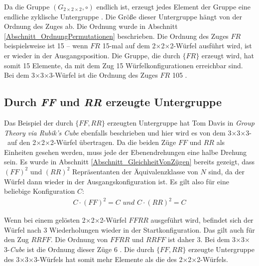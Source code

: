 \documentclass[12pt,a4paper, usenames, dvipsnames]{article}
\theoremstyle{mystyle}
\theoremstyle{definition}
\newcommand{\Gtwo}{\ensuremath{G_{2\times 2\times 2}}}
\newcommand{\Ttwo}{2$\times$2$\times$2-}
\newcommand{\Tthree}{3$\times$3$\times$3-}
\begin{document}
Da die Gruppe $(\Gtwo, \circ)$ endlich ist, erzeugt jedes Element der Gruppe eine endliche zyklische Untergruppe \cite{TD}. Die Größe dieser Untergruppe hängt von der Ordnung des Zuges ab. Die Ordnung wurde in Abschnitt \ref{Abschnitt_OrdnungPermutationen} beschrieben.
Die Ordnung des Zuges $FR$ beispielsweise ist 15 -- wenn $FR$ 15-mal auf dem \Ttwo Würfel ausführt wird, ist er wieder in der Ausgangsposition. 
Die Gruppe, die durch $\{FR\}$ erzeugt wird, hat somit 15 Elemente, da mit dem Zug 15 Würfelkonfigurationen erreichbar sind. Bei dem \Tthree Würfel ist die Ordnung des Zuges $FR$ 105 \cite{TD}.
%
%
%
%
%
%
%
%
%
%
%
%
%
%
%
%
%
%
%

\subsection{Durch \textit{FF} und \textit{RR} erzeugte Untergruppe}
\label{Abschnitt_UntergruppeFFRR}

Das Beispiel der durch $\{ FF, RR \}$ erzeugten Untergruppe hat Tom Davis in \textit{Group Theory via Rubik's Cube} \cite{TD} ebenfalls beschrieben und hier wird es von dem \Tthree \ auf den \Ttwo Würfel übertragen.
Da die beiden Züge $FF$ und $RR$ als Einheiten gesehen werden, muss jede der Ebenendrehungen eine halbe Drehung sein.
Es wurde in Abschnitt \ref{Abschnitt_GleichheitVonZügen} bereits gezeigt, dass $(FF)^2$ und $(RR)^2$ Repräsentanten der Äquivalenzklasse von $N$ sind, da der Würfel dann wieder in der Ausgangskonfiguration ist. Es gilt also für eine beliebige Konfiguration $C$:
\begin{align*}
C \cdot (FF)^2 = C \textit{ und } C \cdot (RR)^2 = C
\end{align*}

Wenn bei einem gelösten \Ttwo Würfel $FFRR$ ausgeführt wird, befindet sich der Würfel nach 3 Wiederholungen wieder in der Startkonfiguration. Das gilt auch für den Zug $RRFF$. Die Ordnung von $FFRR$ und $RRFF$ ist daher 3. Bei dem \Tthree \textit{Cube} ist die Ordnung dieser Züge 6 \cite{TD}.
Die durch $\{ FF, RR \}$ erzeugte Untergruppe des \Tthree Würfels hat somit mehr Elemente als die des \Ttwo Würfels. 
\end{document}
